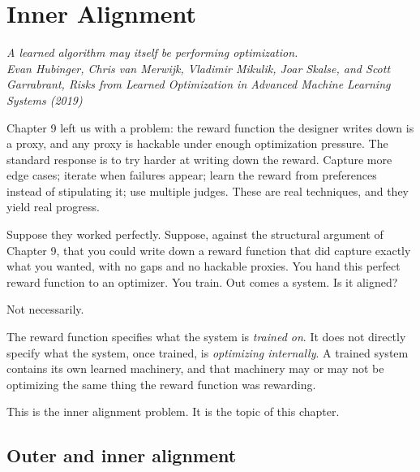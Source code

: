 \chapter{Inner Alignment}

\vspace{1em}
\hfill
\begin{minipage}[c]{0.55\textwidth}
\raggedleft
\small\itshape
A learned algorithm may itself be performing optimization.\\[0.5em]
\upshape\footnotesize Evan Hubinger, Chris van Merwijk, Vladimir Mikulik, Joar Skalse, and Scott Garrabrant, \textit{Risks from Learned Optimization in Advanced Machine Learning Systems} (2019)
\end{minipage}%
\hspace{0.5em}
\begin{minipage}[c]{0.12\textwidth}
\end{minipage}
\vspace{1.5em}

\noindent Chapter 9 left us with a problem: the reward function the designer writes down is a proxy, and any proxy is hackable under enough optimization pressure. The standard response is to try harder at writing down the reward. Capture more edge cases; iterate when failures appear; learn the reward from preferences instead of stipulating it; use multiple judges. These are real techniques, and they yield real progress.

Suppose they worked perfectly. Suppose, against the structural argument of Chapter 9, that you could write down a reward function that did capture exactly what you wanted, with no gaps and no hackable proxies. You hand this perfect reward function to an optimizer. You train. Out comes a system. Is it aligned?

Not necessarily.

The reward function specifies what the system is \emph{trained on}. It does not directly specify what the system, once trained, is \emph{optimizing internally}. A trained system contains its own learned machinery, and that machinery may or may not be optimizing the same thing the reward function was rewarding.

This is the inner alignment problem. It is the topic of this chapter.

\section*{Outer and inner alignment}

